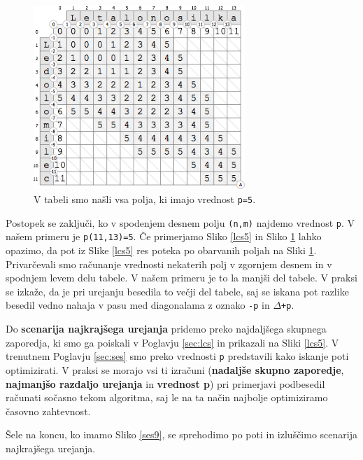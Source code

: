\documentclass[a4paper, 12pt, twoside]{book}
\begin{document}
\begin{figure}[placement h]
\begin{center}
\includegraphics[width=8cm]{ses8.png}
\end{center}
\caption{V tabeli smo našli vsa polja, ki imajo vrednost {\tt p=5}.}
\label{ses8}
\end{figure}

Postopek se zaključi, ko v spodenjem desnem polju {\tt (n,m)} najdemo vrednost {\tt p}. V našem primeru je {\tt p(11,13)=5}. Če primerjamo Sliko \ref{lcs5} in Sliko \ref{ses8} lahko opazimo, da pot iz Slike \ref{lcs5} res poteka po obarvanih poljah na Sliki \ref{ses8}. Privarčevali smo računanje vrednosti nekaterih polj v zgornjem desnem in v spodnjem levem delu tabele. V našem primeru je to la manjši del tabele. V praksi se izkaže, da je pri urejanju besedila to večji del tabele, saj se iskana pot razlike besedil vedno nahaja v pasu med diagonalama z oznako {\tt -p} in {\tt $\Delta$+p}.

Do \textbf{scenarija najkrajšega urejanja} pridemo preko najdaljšega skupnega zaporedja, ki smo ga poiskali v Poglavju \ref{sec:lcs} in prikazali na Sliki \ref{lcs5}. V trenutnem Poglavju \ref{sec:ses} smo preko vrednosti {\tt p} predstavili kako iskanje poti optimizirati. V praksi se morajo vsi ti izračuni (\textbf{nadaljše skupno zaporedje}, \textbf{najmanjšo razdaljo urejanja} in \textbf{vrednost p}) pri primerjavi podbesedil računati sočasno tekom algoritma, saj le na ta način najbolje optimiziramo časovno zahtevnost.

\pagebreak

Šele na koncu, ko imamo Sliko \ref{ses9}, se sprehodimo po poti in izluščimo scenarija najkrajšega urejanja.
\end{document}
